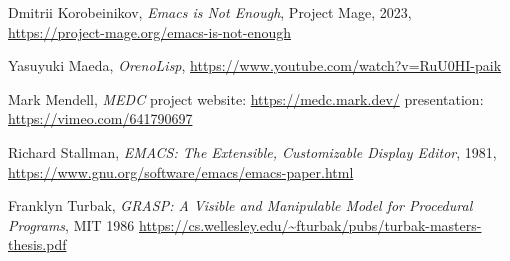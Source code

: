 \documentclass[sigconf]{acmart}
\begin{document}
\begin{thebibliography}{14}
  Dmitrii Korobeinikov, \emph{Emacs is Not Enough}, Project Mage, 2023, 
  \url{https://project-mage.org/emacs-is-not-enough}
  
  Yasuyuki Maeda, \emph{OrenoLisp}, \url{https://www.youtube.com/watch?v=RuU0HI-paik}

  Mark Mendell, \emph{MEDC}
  project website: \url{https://medc.mark.dev/}
  presentation: \url{https://vimeo.com/641790697}
  
  Richard Stallman, \emph{EMACS: The Extensible, Customizable Display Editor},
  1981, \url{https://www.gnu.org/software/emacs/emacs-paper.html}

  Franklyn Turbak, \emph{GRASP: A Visible and Manipulable Model for Procedural Programs}, MIT 1986 \url{https://cs.wellesley.edu/~fturbak/pubs/turbak-masters-thesis.pdf}
  
\end{thebibliography}
\end{document}
